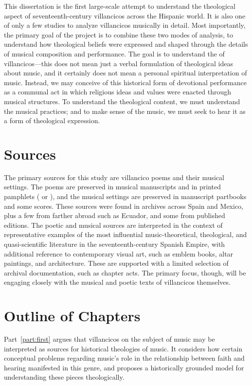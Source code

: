 This dissertation is the first large-scale attempt to understand the theological aspect of seventeenth-century villancicos across the Hispanic world.
It is also one of only a few studies to analyze villancicos musically in detail.
Most importantly, the primary goal of the project is to combine these two modes of analysis, to understand how theological beliefs were expressed and shaped through the details of musical composition and performance.
The goal is to understand the  of villancicos---this does not mean just a verbal formulation of theological ideas about music, and it certainly does not mean a personal spiritual interpretation of music.
Instead, we may conceive of this historical form of devotional performance as a communal act in which religious ideas and values were enacted through musical structures.
To understand the theological content, we must understand the musical practices; and to make sense of the music, we must seek to hear it as a form of theological expression.

\section{%
Sources
}

The primary sources for this study are villancico poems and their musical settings.
The poems are preserved in musical manuscripts and in printed pamphlets ( or ), and the musical settings are preserved in manuscript partbooks and some scores.
These sources were found in archives across Spain and Mexico, plus a few from farther abroad such as Ecuador, and some from published editions.
The poetic and musical sources are interpreted in the context of representative examples of the most influential music-theoretical, theological, and quasi-scientific literature in the seventeenth-century Spanish Empire, with additional reference to contemporary visual art, such as emblem books, altar paintings, and architecture.
These are supported with a limited selection of archival documentation, such as chapter acts.
The primary focus, though, will be engaging closely with the musical and poetic texts of villancicos themselves.

\section{%
Outline of Chapters
}

Part~\ref{part:first}  argues that villancicos on the subject of music may be interpreted as sources for historical theologies of music. 
It considers how certain conceptual problems regarding music's role in the relationship between faith and hearing manifested in this genre, and proposes a historically grounded model for understanding these pieces theologically.

